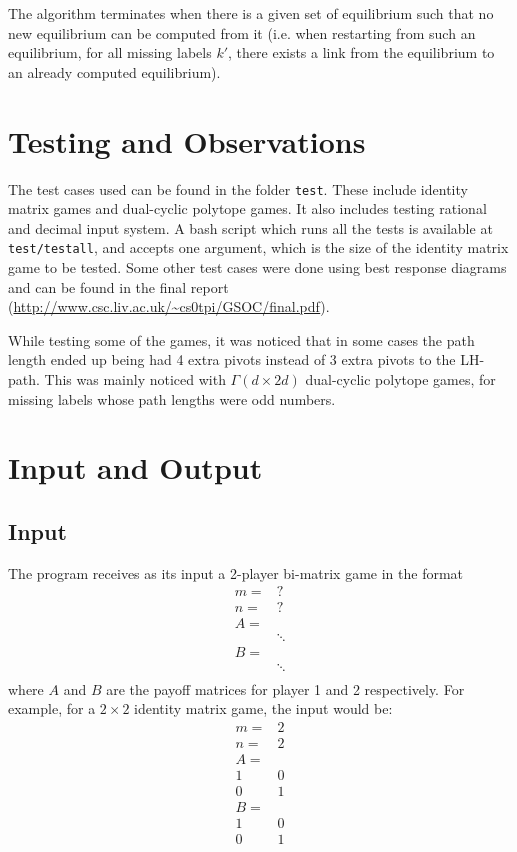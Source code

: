 \documentclass[a4paper,12pt]{article}  %
\begin{document}
    The algorithm terminates when there is a given set of equilibrium such that
    no new equilibrium can be computed from it (i.e. when restarting from such
    an equilibrium, for all missing labels $k'$, there exists a link from the
    equilibrium to an already computed equilibrium).
    
    \section{Testing and Observations}
    The test cases used can be found in the folder \verb|test|. These include
    identity matrix games and dual-cyclic polytope games. It also includes testing
    rational and decimal input system. A bash script which runs all the tests is
    available at \verb|test/testall|, and accepts one argument, which is the
    size of the identity matrix game to be tested. Some other test cases were
    done using best response diagrams and can be found in the final report 
    (\url{http://www.csc.liv.ac.uk/~cs0tpi/GSOC/final.pdf}).
    
    While testing some of the games, it was noticed that in some cases the 
    path length ended up being had 4 extra pivots instead of 3 extra pivots to
    the LH-path. This was mainly noticed with $\Gamma(d \times 2d)$ dual-cyclic
    polytope games, for missing labels whose path lengths were odd numbers.
    
    \section{Input and Output}
    \subsection{Input}
    The program receives as its input a 2-player bi-matrix game in the format\\
    \[
    \begin{matrix}
        m= & ?\\
        n= & ?\\
        A=\\
        &\ddots\\
        B=\\
        &\ddots\\
    \end{matrix}\]
    where $A$ and $B$ are the payoff matrices for player 1 and 2 respectively.
    For example, for a $2 \times 2$ identity matrix game, the input would be:
    \[
    \begin{matrix}
        m= & 2\\
        n= & 2\\
        A=\\
        1 & 0\\
        0 & 1\\
        B=\\
        1 & 0\\
        0 & 1\\
    \end{matrix}
    \]
\end{document}
